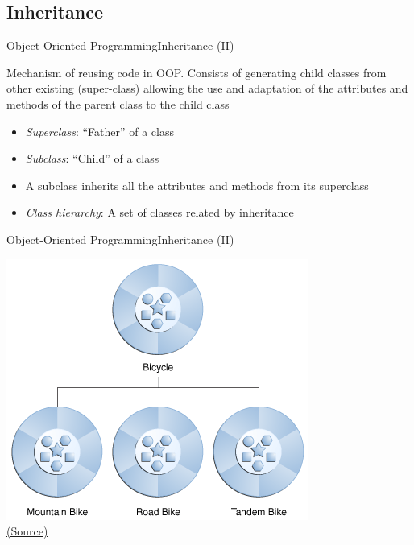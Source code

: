 \documentclass[10pt,compress]{beamer} %
\begin{document}


\subsection{Inheritance}

\begin{frame}{Object-Oriented Programming}{Inheritance (II)}
\vspace{-0.2cm}
	\begin{block}{}
	Mechanism of \alert{reusing} code in OOP. Consists of generating child classes from other existing (\alert{super-class}) allowing the use and adaptation of the attributes and methods of the parent class to the child class
  	\end{block}	
\vspace{-0.2cm}
\begin{itemize}
	\item \textit{Superclass}: ``Father'' of a class
	\item \textit{Subclass}: ``Child'' of a class
	\item A subclass inherits all the attributes and methods from its superclass
	\item \textit{Class hierarchy}: A set of classes related by inheritance
\end{itemize}
\end{frame}

\begin{frame}{Object-Oriented Programming}{Inheritance (II)}
	\begin{center}
		\includegraphics[width=0.5\linewidth]{figs/concepts-bikeHierarchy2}\\
	
		\tiny\href{http://docs.oracle.com/javase/tutorial/java/concepts/inheritance.html}{(Source)}
	\end{center}
\end{frame}
\end{document}
